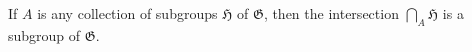 If $A$ is any collection of subgroups $\mathfrak{H}$ of $\mathfrak{G}$, then the intersection $\bigcap_A \mathfrak{H}$ is a subgroup of $\mathfrak{G}$.
